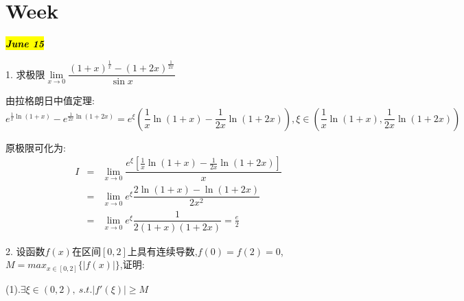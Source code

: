
\section{Week }
\hl{\textbf{\textit{June 15}}}

1. 求极限$\lim\limits_{x\rightarrow 0}\dfrac{(1+x)^{\frac{1}{x}}-(1+2x)^{\frac{1}{2x}}}{\sin x}$
\begin{solution}
	
	由拉格朗日中值定理: 
	$$e^{\frac{1}{x}\ln(1+x)}-e^{\frac{1}{2x}\ln(1+2x)}=e^{\xi}(\frac{1}{x}\ln(1+x)-\frac{1}{2x}\ln(1+2x)),\xi\in(\frac{1}{x}\ln(1+x),\frac{1}{2x}\ln(1+2x))$$
	
	原极限可化为: 
	\begin{eqnarray*}
		I&=&\lim\limits_{x\rightarrow 0}\dfrac{e^{\xi}[\frac{1}{x}\ln(1+x)-\frac{1}{2x}\ln(1+2x)]}{x}\\
		&=&\lim\limits_{x\rightarrow 0}e^{\xi}\dfrac{2\ln(1+x)-\ln(1+2x)}{2x^2}\\
		&=&\lim\limits_{x\rightarrow 0}e^{\xi}\dfrac{1}{2(1+x)(1+2x)}=\frac{e}{2}
	\end{eqnarray*}
\end{solution}


2. 设函数$f(x)$在区间$[0,2]$上具有连续导数,$f(0)=f(2)=0$,$M=max_{x\in[0,2]}\{|f(x)|\}$,证明: 

(1).$\exists\xi\in(0,2),\ s.t. |f'(\xi)|\geq M$

